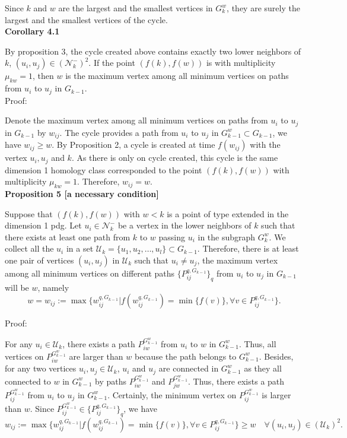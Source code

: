 \documentclass[a4paper,12pt]{article}
\numberwithin{equation}{section}
\begin{document}
	Since $k$ and $w$ are the largest and the smallest vertices in $G_k^w$, they are surely the largest and the smallest vertices of the cycle. \\
	
	

	\noindent \textbf{Corollary 4.1} 
	
	By proposition 3, the cycle created above contains exactly two lower neighbors of $k$, $(u_i,u_j) \in (\mathcal{N}_k^-)^2$. 
	If the point $(f(k),f(w))$ is with multiplicity $\mu_{kw} = 1$, then $w$ is the maximum vertex among all minimum vertices on paths from $u_i$ to $u_j$ in $G_{k-1}$.\\ 
	
	\noindent Proof:
	
	Denote the maximum vertex among all minimum vertices on paths from $u_i$ to $u_j$ in $G_{k-1}$ by $w_{ij}$. 
	The cycle provides a path from $u_i$ to $u_j$ in $G^w_{k-1} \subset G_{k-1}$, we have $w_{ij} \geq w$.
	By Proposition 2, a cycle is created at time $f(w_{ij})$ with the vertex $u_i,u_j$ and $k$. As there is only on cycle created, this cycle is the same dimension 1 homology class corresponded to the point $(f(k), f(w))$ with multiplicity $\mu_{kw} = 1$. Therefore, $w_{ij} = w$.\\
	
	
	\noindent \textbf{Proposition 5 [a necessary condition]}
	
	Suppose that $(f(k), f(w))$ with $w < k$ is a point of type extended in the dimension 1 pdg. Let $u_i \in \mathcal{N}_k^-$ be a vertex in the lower neighbors of $k$ such that there exists at least one path from $k$ to $w$ passing $u_i$ in the subgraph $G_k^w$. We collect all the $u_i$ in a set $\mathcal{U}_k = \{ u_1,u_2,\ldots, u_l\} \subset G_{k-1}$. Therefore, there is at least one pair of vertices $(u_i, u_j)$ in $\mathcal{U}_k$ such that $u_i \neq u_j$, the maximum vertex among all minimum vertices on different paths $\{ P^{q,G_{k-1}}_{ij} \}_q$ from $u_i$ to $u_j$ in $G_{k-1}$ will be $w$, namely 
	$$w =w_{ij} := \max \{ w^{q,G_{k-1}}_{ij} \vert f(w^{q,G_{k-1}}_{ij}) = \min \{ f(v) \}, \forall v \in P^{q,G_{k-1}}_{ij}  \}.$$
	
	
	\noindent Proof: 
	
	For any $u_i \in \mathcal{U}_k$, there exists a path $P_{iw}^{G_{k-1}^w}$ from $u_i$ to $w$ in $G_{k-1}^w$. Thus, all vertices on $P_{iw}^{G_{k-1}^w}$ are larger than $w$ because the path belongs to $G_{k-1}^w$. Besides, for any two vertices $u_i, u_j \in \mathcal{U}_k$, $u_i$ and $u_j$ are connected in $G_{k-1}^w$ as they all connected to $w$ in $G_{k-1}^w$ by paths $P_{iw}^{G_{k-1}^w}$ and $P_{jw}^{G_{k-1}^w}$. Thus, there exists a path $P_{ij}^{G_{k-1}^w}$ from $u_i$ to $u_j$ in $G_{k-1}^w$. Certainly, the minimum vertex on $P_{ij}^{G_{k-1}^w}$ is larger than $w$. Since $P_{ij}^{G_{k-1}^w} \in \{ P_{ij}^{q,G_{k-1}} \}_q$, we have 
	$$ w_{ij} := \max \{ w_{ij}^{q,G_{k-1}} \vert f(w_{ij}^{q,G_{k-1}}) = \min \{ f(v) \}, \forall v \in P^{q,G_{k-1}}_{ij}  \} \geq w \quad \forall (u_i,u_j)\in (\mathcal{U}_k)^2.$$
	
\end{document}
